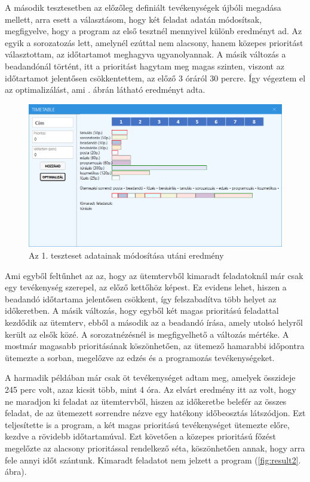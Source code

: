 
A második tesztesetben az előzőleg definiált tevékenységek újbóli megadása mellett, arra esett a választásom, hogy két feladat adatán módosítsak, megfigyelve, hogy a program az első tesztnél mennyivel különb eredményt ad. Az egyik a sorozatozás lett, amelynél ezúttal nem alacsony, hanem közepes prioritást választottam, az időtartamot meghagyva ugyanolyannak. A másik változás a beadandónál történt, itt a prioritást hagytam meg magas szinten, viszont az időtartamot jelentősen csökkentettem, az előző 3 óráról 30 percre. Így végeztem el az optimalizálást, ami . ábrán látható eredményt adta.

\begin{figure}[h!]
	\centering
	\includegraphics[width=\textwidth]{images/test/result1-2.png}
	\caption{Az 1. teszteset adatainak módosítása utáni eredmény}
	\label{fig:result1-2}
\end{figure}

Ami egyből feltűnhet az az, hogy az ütemtervből kimaradt feladatoknál már csak egy tevékenység szerepel, az előző kettőhöz képest. Ez evidens lehet, hiszen a beadandó időtartama jelentősen csökkent, így felszabadítva több helyet az időkeretben. A másik változás, hogy egyből két magas prioritású feladattal kezdődik az ütemterv, ebből a második az a beadandó írása, amely utolsó helyről került az elsők közé. A sorozatnézésnél is megfigyelhető a változás mértéke. A mostmár magasabb prioritásának köszönhetően, az ütemező hamarabbi időpontra ütemezte a sorban, megelőzve az edzés és a programozás tevékenységeket.


A harmadik példában már csak öt tevékenységet adtam meg, amelyek összideje 245 perc volt, azaz kicsit több, mint 4 óra. Az elvárt eredmény itt az volt, hogy ne maradjon ki feladat az ütemtervből, hiszen az időkeretbe belefér az összes feladat, de az ütemezett sorrendre nézve egy hatékony időbeosztás látszódjon. Ezt teljesítette is a program, a két magas prioritású tevékenységet ütemezte előre, kezdve a rövidebb időtartamúval. Ezt követően a közepes prioritású főzést megelőzte az alacsony prioritással rendelkező séta, köszönhetően annak, hogy arra fele annyi időt szántunk. Kimaradt feladatot nem jelzett a program (\ref{fig:result2}. ábra).

